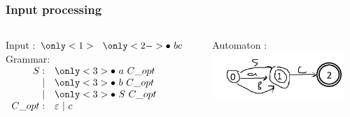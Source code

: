 \documentclass{beamer}
\begin{document}
	\begin{frame} 
		\frametitle{Input processing}
		\begin{columns}
			\begin{column}{5cm}
				Input : $\only<1>{\ \ }\only<2->{\bullet} \ b c $ \\
				\vspace{15pt}
				Grammar: \\
				\vspace{5pt}
				$
				\begin{array}{rl}
				S :&\only<3>{\bullet} \ a\ C\_opt \\
				|&\only<3>{\bullet} \ b\ C\_opt \\
				|&\only<3>{\bullet} \ S\ C\_opt \\
				C\_opt :& \varepsilon \ | \ c \\
				\end{array}
				$
			\end{column}
			\begin{column}{5cm}
				Automaton : \\
				\includegraphics[width=5cm]{pictures/G2.jpg}
			\end{column}
			\vspace{-20pt}
		\end{columns}

	\end{frame}
	
\end{document}
